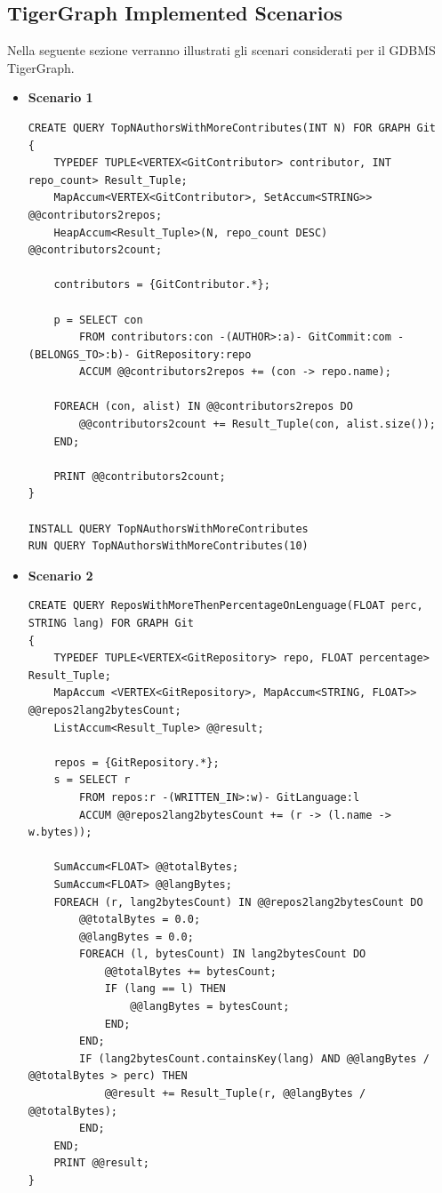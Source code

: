 \documentclass[11pt]{article}
\begin{document}
\subsection{TigerGraph Implemented Scenarios}
Nella seguente sezione verranno illustrati gli scenari considerati per il GDBMS TigerGraph. 
\begin{itemize}
    \item \textbf{Scenario 1}
\begin{lstlisting}[style = all, style=GSQLStyle] 
CREATE QUERY TopNAuthorsWithMoreContributes(INT N) FOR GRAPH Git
{
    TYPEDEF TUPLE<VERTEX<GitContributor> contributor, INT repo_count> Result_Tuple;
    MapAccum<VERTEX<GitContributor>, SetAccum<STRING>> @@contributors2repos;
    HeapAccum<Result_Tuple>(N, repo_count DESC) @@contributors2count;

    contributors = {GitContributor.*};

    p = SELECT con
        FROM contributors:con -(AUTHOR>:a)- GitCommit:com -(BELONGS_TO>:b)- GitRepository:repo
        ACCUM @@contributors2repos += (con -> repo.name);

    FOREACH (con, alist) IN @@contributors2repos DO
        @@contributors2count += Result_Tuple(con, alist.size());
    END;
  
    PRINT @@contributors2count;
}

INSTALL QUERY TopNAuthorsWithMoreContributes
RUN QUERY TopNAuthorsWithMoreContributes(10)
\end{lstlisting}

    \item \textbf{Scenario 2}
\begin{lstlisting}[style = all, style=GSQLStyle] 
CREATE QUERY ReposWithMoreThenPercentageOnLenguage(FLOAT perc, STRING lang) FOR GRAPH Git
{
    TYPEDEF TUPLE<VERTEX<GitRepository> repo, FLOAT percentage> Result_Tuple;
    MapAccum <VERTEX<GitRepository>, MapAccum<STRING, FLOAT>> @@repos2lang2bytesCount;
    ListAccum<Result_Tuple> @@result;

    repos = {GitRepository.*};
    s = SELECT r
        FROM repos:r -(WRITTEN_IN>:w)- GitLanguage:l
        ACCUM @@repos2lang2bytesCount += (r -> (l.name -> w.bytes));

    SumAccum<FLOAT> @@totalBytes;
    SumAccum<FLOAT> @@langBytes;
    FOREACH (r, lang2bytesCount) IN @@repos2lang2bytesCount DO
        @@totalBytes = 0.0;
        @@langBytes = 0.0;
        FOREACH (l, bytesCount) IN lang2bytesCount DO
            @@totalBytes += bytesCount;
            IF (lang == l) THEN
                @@langBytes = bytesCount;
            END;
        END;
        IF (lang2bytesCount.containsKey(lang) AND @@langBytes / @@totalBytes > perc) THEN
            @@result += Result_Tuple(r, @@langBytes / @@totalBytes);
        END;
    END;
    PRINT @@result;
}


\end{lstlisting}
\end{itemize}
\end{document}
